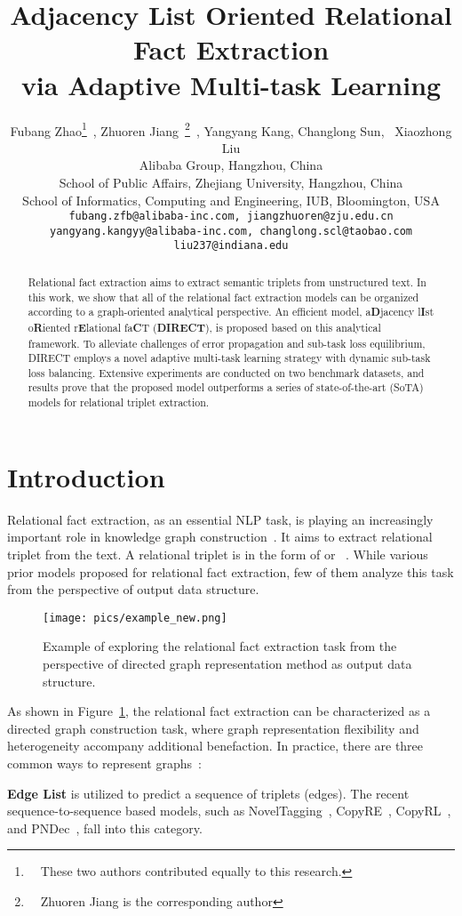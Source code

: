 \documentclass[11pt,a4paper]{article}
\title{Adjacency List Oriented Relational Fact Extraction \\via Adaptive Multi-task Learning}
\author{Fubang Zhao\thanks{~~These two authors contributed equally to this research.}~, Zhuoren Jiang\footnotemark[1]~\thanks{~~Zhuoren Jiang is the corresponding author}~, Yangyang Kang, Changlong Sun, ~Xiaozhong Liu  \\
Alibaba Group, Hangzhou, China\\
School of Public Affairs, Zhejiang University, Hangzhou, China\\
School of Informatics, Computing and Engineering, IUB, Bloomington, USA\\
{\tt fubang.zfb@alibaba-inc.com, jiangzhuoren@zju.edu.cn}\\
{\tt yangyang.kangyy@alibaba-inc.com, changlong.scl@taobao.com}\\
{\tt liu237@indiana.edu}}
\date{}
\begin{document}
\maketitle
\begin{abstract}
Relational fact extraction aims to extract semantic triplets from unstructured text. In this work, we show that all of the relational fact extraction models can be organized according to a graph-oriented analytical perspective. An efficient model, a\textbf{D}jacency l\textbf{I}st o\textbf{R}iented r\textbf{E}lational fa\textbf{C}T (\textbf{DIRECT}), is proposed based on this analytical framework. To alleviate challenges of error propagation and sub-task loss equilibrium, DIRECT employs a novel adaptive multi-task learning strategy with dynamic sub-task loss balancing. Extensive experiments are conducted on two benchmark datasets, and results prove that the proposed model outperforms a series of state-of-the-art (SoTA) models for relational triplet extraction.
\end{abstract}

\section{Introduction}\label{sec:intro}
Relational fact extraction, as an essential NLP task, is playing an increasingly important role in knowledge graph construction~\cite{han2019opennre,distiawan2019neural}. It aims to extract relational triplet from the text. A relational triplet is in the form of  or ~\cite{zeng2019learning}. While various prior models proposed for relational fact extraction, few of them analyze this task from the perspective of output data structure.

\begin{figure}[ht]
\centering
\texttt{[image: pics/example\_new.png]}
\caption{Example of exploring the relational fact extraction task from the perspective of directed graph representation method as output data structure.}
\label{fig:example}
\end{figure}

As shown in Figure~\ref{fig:example}, the relational fact extraction can be characterized as a directed graph construction task, where graph representation flexibility and heterogeneity accompany additional benefaction. In practice, there are three common ways to represent graphs~\cite{gross2005graph}: 

\textbf{Edge List} is utilized to predict a sequence of triplets (edges). The recent sequence-to-sequence based models, such as NovelTagging~\cite{zheng2017joint}, CopyRE~\cite{zeng2018extracting}, CopyRL~\cite{zeng2019learning}, and PNDec~\cite{nayak2020effective}, fall into this category. 
\end{document}
